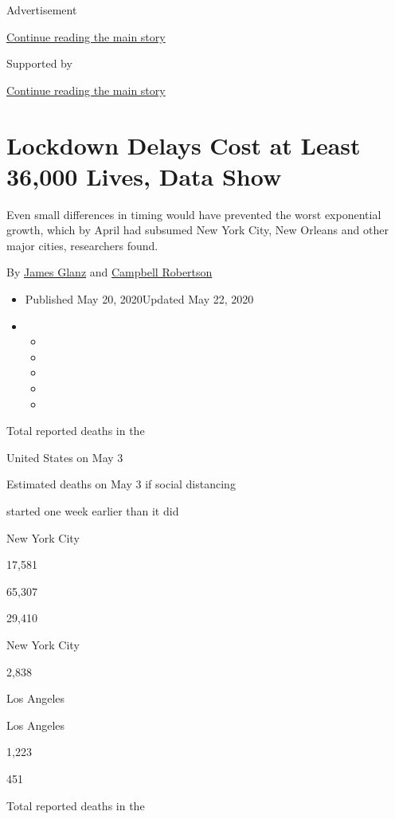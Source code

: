 Advertisement

\protect\hyperlink{after-top}{Continue reading the main story}

Supported by

\protect\hyperlink{after-sponsor}{Continue reading the main story}

\hypertarget{lockdown-delays-cost-at-least-36000-lives-data-show}{%
\section{Lockdown Delays Cost at Least 36,000 Lives, Data
Show}\label{lockdown-delays-cost-at-least-36000-lives-data-show}}

Even small differences in timing would have prevented the worst
exponential growth, which by April had subsumed New York City, New
Orleans and other major cities, researchers found.

By \href{https://www.nytimes.com/by/james-glanz}{James Glanz} and
\href{https://www.nytimes.com/by/campbell-robertson}{Campbell Robertson}

\begin{itemize}
\item
  Published May 20, 2020Updated May 22, 2020
\item
  \begin{itemize}
  \item
  \item
  \item
  \item
  \item
  \end{itemize}
\end{itemize}

Total reported deaths in the

United States on May 3

Estimated deaths on May 3 if social distancing

started one week earlier than it did

New York City

17,581

65,307

29,410

New York City

2,838

Los Angeles

Los Angeles

1,223

451

Total reported deaths in the

